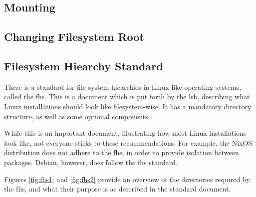\documentclass[a4paper]{article}
\begin{document}


\subsection{Mounting}



\subsection{Changing Filesystem Root}

\subsection{Filesystem Hiearchy Standard}

There is a standard for file system hiearchies in Linux-like operating systems, called the \gls{fhs}. This is a document which is put forth by the \gls{lsb}, describing what Linux installations should look like filesystem-wise\cite{fhs3}. It has a mandatory directory structure, as well as some optional components. 

While this is an important document, illustrating how most Linux installations look like, not everyone sticks to these recommendations. For example, the NixOS distribution does not adhere to the \gls{fhs}, in order to provide isolation between packages\cite{vanderburg2011}. Debian, however, does follow the \gls{fhs} standard.

Figures \ref{fig:fhs1} and \ref{fig:fhs2} provide an overview of the directories required by the \gls{fhs}, and what their purpose is as described in the standard document.
\end{document}
